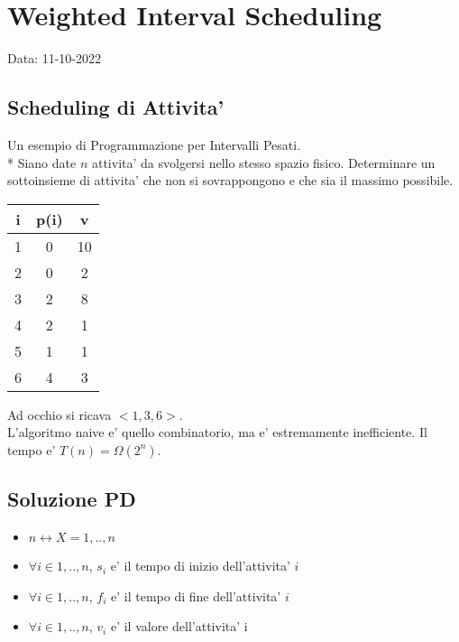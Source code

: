 \chapter{Weighted Interval Scheduling}
Data: 11-10-2022

\section{Scheduling di Attivita'}
Un esempio di Programmazione per Intervalli Pesati. \\*
Siano date $n$ attivita' da svolgersi nello stesso spazio fisico.
Determinare un sottoinsieme di attivita' che non si sovrappongono e che sia il massimo possibile.

\begin{center}
    \begin{tabular}{||c c c||}
        \hline
        i & p(i) & v \\
        \hline
        \hline
        1 & 0 & 10 \\
        \hline
        2 & 0 & 2 \\
        \hline
        3 & 2 & 8 \\
        \hline
        4 & 2 & 1 \\
        \hline
        5 & 1 & 1 \\
        \hline
        6 & 4 & 3 \\
        \hline
    \end{tabular}
\end{center}

Ad occhio si ricava $<1, 3, 6>$. \\

L'algoritmo naive e' quello combinatorio, ma e' estremamente inefficiente. Il tempo e' $T(n) = \Omega(2^n)$.

\section{Soluzione PD}

\begin{itemize}
    \item $n \leftrightarrow X = {1,..,n}$
    \item $\forall i \in {1,..,n}$, $s _ {i}$ e' il tempo di inizio dell'attivita' $i$
    \item $\forall i \in {1,..,n}$, $f _ {i}$ e' il tempo di fine dell'attivita' $i$
    \item $\forall i \in {1,..,n}$, $v _ {i}$ e' il valore dell'attivita' i
\end{itemize}

